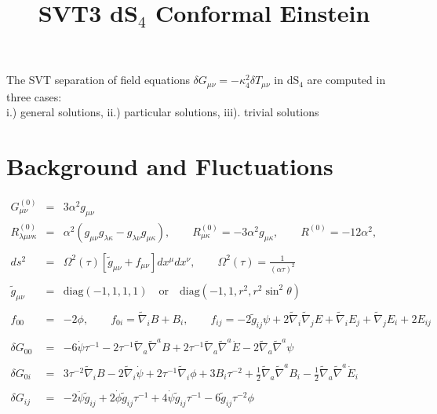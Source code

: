 \documentclass[10pt,letterpaper]{article}
\title{SVT3 dS${}_4$ Conformal Einstein}
\date{}
\numberwithin{equation}{section}
\begin{document}
 
\maketitle
\noindent 
The SVT separation of field equations $\delta G_{\mu\nu} = -\kappa^2_4 \delta T_{\mu\nu}$ in dS${}_4$ are computed in three cases:
\\ i.) general solutions, ii.) particular solutions, iii). trivial solutions
\section{Background and Fluctuations}
\begin{eqnarray}
G^{(0)}_{\mu\nu} &=& 3\alpha^2 g_{\mu\nu}
\\
R^{(0)}_{\lambda\mu\nu\kappa} &=& \alpha^2 (g_{\mu\nu}g_{\lambda\kappa}-g_{\lambda\nu}g_{\mu\kappa}),
\qquad
R^{(0)}_{\mu\kappa} = -3\alpha^2 g_{\mu\kappa},
\qquad
R^{(0)}= -12 \alpha^2,
\\ \nonumber\\
ds^2 &=& \Omega^2(\tau)[\tilde g_{\mu\nu}+ f_{\mu\nu}] dx^\mu dx^\nu,\qquad
\Omega^2(\tau) = \frac{1}{(\alpha\tau)^2}
\\ \nonumber\\
\tilde g_{\mu\nu} &=& \text{diag}(-1,1,1,1)\quad\text{or}\quad \text{diag}(-1,1,r^2,r^2\sin^2\theta)
\\ \nonumber\\
f_{00} &=& -2\phi,\qquad f_{0i}= \tilde \nabla_i B + B_i,\qquad 
f_{ij} = -2 \tilde g_{ij}\psi + 2\tilde\nabla_i\tilde \nabla_j E + \tilde \nabla_i E_j + \tilde \nabla_j E_i + 2E_{ij}
\\ \nonumber\\
\delta G_{00} &=&-6 \dot{\psi} \tau^{-1} - 2 \tau^{-1} \tilde{\nabla}_{a}\tilde{\nabla}^{a}B + 2 \tau^{-1} \tilde{\nabla}_{a}\tilde{\nabla}^{a}\dot{E} - 2 \tilde{\nabla}_{a}\tilde{\nabla}^{a}\psi 
\\ \nonumber\\
\delta G_{0i} &=&3 \tau^{-2} \tilde{\nabla}_{i}B
- 2 \tilde{\nabla}_{i}\dot{\psi}
+ 2 \tau^{-1} \tilde{\nabla}_{i}\phi
+3 B_{i} \tau^{-2}
+ \tfrac{1}{2} \tilde{\nabla}_{a}\tilde{\nabla}^{a}B_{i}
-  \tfrac{1}{2} \tilde{\nabla}_{a}\tilde{\nabla}^{a}\dot{E}_{i}
\\ \nonumber\\
\delta G_{ij}&=&-2 \ddot{\psi} \tilde{g}_{ij}
+ 2 \dot{\phi} \tilde{g}_{ij} \tau^{-1}
+ 4 \dot{\psi} \tilde{g}_{ij} \tau^{-1}
- 6 \tilde{g}_{ij} \tau^{-2} \phi

\end{eqnarray}
\end{document}
